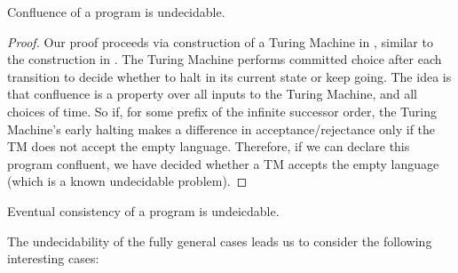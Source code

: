 \begin{lemma}
Confluence of a \lang program is undecidable.
\end{lemma}
\begin{proof}
Our proof proceeds via construction of a Turing Machine in \lang, similar to the construction in .   The Turing Machine performs committed choice after each transition to decide whether to halt in its current state or keep going.  The idea is that confluence is a property over all inputs to the Turing Machine, and all choices of time.  So if, for some prefix of the infinite successor order, the Turing Machine's early halting makes a difference in acceptance/rejectance only if the TM does not accept the empty language.  Therefore, if we can declare this program confluent, we have decided whether a TM accepts the empty language (which is a known undecidable problem).
\end{proof}

\begin{corollary}
Eventual consistency of a \lang program is undeicdable.
\end{corollary}

The undecidability of the fully general cases leads us to consider the following interesting cases:

